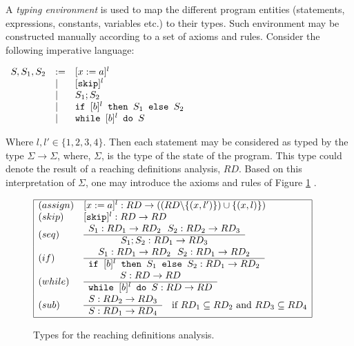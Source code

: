 \documentclass[10pt,a4paper,final,oneside,fleqn]{book}
\begin{document}
A {\itshape typing environment\/} is used to map the different program entities (statements, expressions, constants, variables etc.) to their types.  Such environment may be constructed manually according to a set of axioms and rules. Consider the following imperative language:\vspace{6mm}

\noindent
$\begin{array}{lll}
S,S_1,S_2&:=&[x:=a]^l\\
&\mid&[\mbox{\texttt{skip}}]^l\\
&\mid&S_1;S_2\\
&\mid&\mbox{\texttt{if }}[b]^l\mbox{\texttt{ then }}S_1\mbox{\texttt{ else }}S_2\\
&\mid&\mbox{\texttt{while }}[b]^l\mbox{\texttt{ do }}S\\
\end{array}$\vspace{6mm}

\noindent
Where $l,l'\in\{1,2,3,4\}$.  Then each statement may be considered as typed by the type $\Sigma\to\Sigma$, where, $\Sigma$, is the type of the state of the program.  This type could denote the result of a reaching definitions analysis, $RD$. Based on this interpretation of $\Sigma$, one may introduce the axioms and rules of Figure \ref{RD} \cite{nielson1}.
\begin{figure}[bht]
\begin{center}
$\begin{array}{|ll|}\hline
(assign)&[x:=a]^l:RD\to((RD\backslash\{(x,l')\})\cup\{(x,l)\})\\
(skip)&[\texttt{skip}]^l:RD\to RD\\
(seq)&\begin{array}[c]{c}S_1:RD_1\to RD_2~~S_2:RD_2\to RD_3\\\hline S_1;S_2:RD_1\to RD_3\end{array}\\
(if)&\begin{array}[c]{c}S_1:RD_1\to RD_2~~S_2:RD_1\to RD_2\\\hline\mbox{\texttt{if }}[b]^l\mbox{\texttt{ then }}S_1\mbox{\texttt{ else }}S_2:RD_1\to RD_2\end{array}\\
(while)&\begin{array}[c]{c}S:RD\to RD\\\hline\mbox{\texttt{while }}[b]^l\mbox{\texttt{ do }}S:RD\to RD\end{array}\\
(sub)&\begin{array}[c]{c}S:RD_2\to RD_3\\\hline S:RD_1\to RD_4\end{array}~~~\mbox{if }RD_1\subseteq RD_2\mbox{ and }RD_3\subseteq RD_4\\
\hline
\end{array}$
\end{center}
\caption{Types for the reaching definitions analysis.\label{RD}}
\end{figure}
\end{document}
